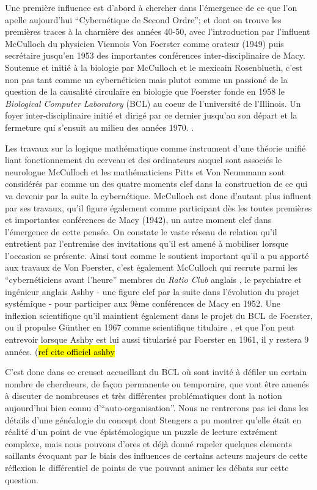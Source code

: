 Une première influence est d'abord à chercher dans l'émergence de ce que l'on apelle aujourd'hui \enquote{Cybernétique de Second Ordre}; et dont on trouve les premières traces à la charnière des années 40-50, avec l'introduction par l'influent McCulloch du physicien Viennois Von Foerster comme orateur (1949) puis secrétaire jusqu'en 1953 des importantes conférences inter-disciplinaire de Macy. Soutenue et initié à la biologie par McCulloch et le mexicain Rosenblueth, c'est non pas tant comme un cybernéticien mais plutot comme un passioné de la question de la causalité circulaire en biologie  que Foerster fonde en 1958 le \textit{Biological Computer Laboratory} (BCL) au coeur de l'université de l'Illinois. Un foyer inter-disciplinaire initié et dirigé par ce dernier jusqu'au son départ et la fermeture qui s'ensuit au milieu des années 1970. \autocite{Proulx2003}. 

Les travaux sur la logique mathématique comme instrument d'une théorie unifié liant fonctionnement du cerveau et des ordinateurs auquel sont associés le neurologue McCulloch et les mathématiciens Pitts et Von Neummann sont considérés par \autocite[777]{Pouvreau2013} comme un des quatre moments clef dans la construction de ce qui va devenir par la suite la cybernétique. McCulloch est donc d'autant plus influent par ses travaux, qu'il figure également comme participant dès les toutes premières et importantes conférences de Macy (1942), un autre moment clef dans l'émergence de cette pensée. On constate le vaste réseau de relation qu'il entretient par l'entremise des invitations qu'il est amené à mobiliser lorsque l'occasion se présente. Ainsi tout comme le soutient important qu'il a pu apporté aux travaux de Von Foerster, c'est également McCulloch qui recrute parmi les \enquote{cybernéticiens avant l'heure} membres du \textit{Ratio Club} anglais , le psychiatre et ingénieur anglais Ashby - une figure clef par la suite dans l'évolution du projet systémique - pour participer aux 9ème conférences de Macy en 1952. Une inflexion scientifique qu'il maintient également dans le projet du BCL de Foerster, ou il propulse Günther en 1967 comme scientifique titulaire , et que l'on peut entrevoir lorsque Ashby est lui aussi titularisé par Foerster en 1961, il y restera 9 années. (\hl{ref cite officiel ashby}

C'est donc dans ce creuset accueillant du BCL où sont invité à défiler un certain nombre de chercheurs, de façon permanente ou temporaire, que vont être amenés à discuter de nombreuses et très différentes problématiques dont la notion aujourd'hui bien connu d'\enquote{auto-organisation}. Nous ne rentrerons pas ici dans les détails d'une généalogie du concept dont Stengers \autocite{CREA1985}  a pu montrer qu'elle était en réalité d'un point de vue épistémologique un puzzle de lecture extrément complexe, mais nous pouvons d'ores et déjà donné rapeler quelques elements saillants évoquant par le biais des influences de certains acteurs majeurs de cette réflexion le différentiel de points de vue pouvant animer les débats sur cette question.


